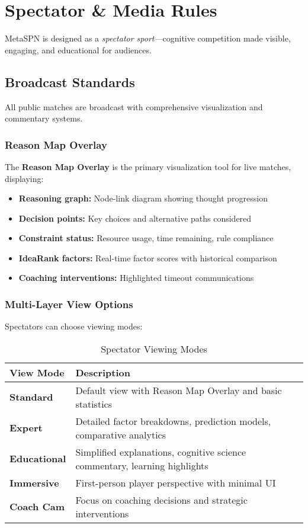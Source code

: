 \chapter{Spectator \& Media Rules}
\label{ch:spectator}

MetaSPN is designed as a \textit{spectator sport}—cognitive competition made visible, engaging, and educational for audiences.

\section{Broadcast Standards}

All public matches are broadcast with comprehensive visualization and commentary systems.

\subsection{Reason Map Overlay}

The \textbf{Reason Map Overlay} is the primary visualization tool for live matches, displaying:

\begin{itemize}[leftmargin=*]
  \item \textbf{Reasoning graph:} Node-link diagram showing thought progression
  \item \textbf{Decision points:} Key choices and alternative paths considered
  \item \textbf{Constraint status:} Resource usage, time remaining, rule compliance
  \item \textbf{IdeaRank factors:} Real-time factor scores with historical comparison
  \item \textbf{Coaching interventions:} Highlighted timeout communications
\end{itemize}

\subsection{Multi-Layer View Options}

Spectators can choose viewing modes:

\begin{table}[h]
\centering
\begin{tabular}{@{}lp{9cm}@{}}
\toprule
\textbf{View Mode} & \textbf{Description} \\ \midrule
\textbf{Standard} & Default view with Reason Map Overlay and basic statistics \\
\textbf{Expert} & Detailed factor breakdowns, prediction models, comparative analytics \\
\textbf{Educational} & Simplified explanations, cognitive science commentary, learning highlights \\
\textbf{Immersive} & First-person player perspective with minimal UI \\
\textbf{Coach Cam} & Focus on coaching decisions and strategic interventions \\ \bottomrule
\end{tabular}
\caption{Spectator Viewing Modes}
\label{tab:viewing_modes}
\end{table}

